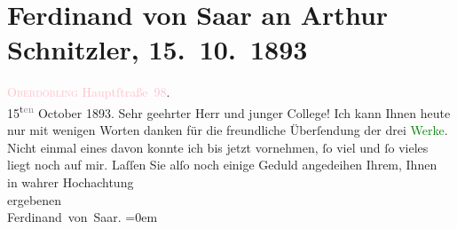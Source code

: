 

               \section[Ferdinand von Saar an Arthur Schnitzler, 15. 10. 1893]{ Ferdinand von Saar an Arthur Schnitzler,
                    15. 10. 1893}\nopagebreak{}\rehead{ }\normalsize\beginnumbering{} \toendnotes[C]{\smallbreak\pagebreak[2]} 
\toendnotes[C]{\smallbreak}\pstart
           \raggedleft{}{\pb}\textcolor{pink}{\textsc{Oberdöbling} Hauptſtraße 98}{}\ledrightnote{\textcolor{pink}{Döblinger Hauptstraße}}.{\\}15\textsuperscript{t\textcolor{gray}{en}} October 1893.\pend
           \pstart{}Sehr geehrter Herr und junger College!\pend\pstart
           Ich kann Ihnen heute nur mit wenigen Worten danken für die freundliche
                    Überſendung der drei \textcolor{green}{Werke}{}. Nicht einmal eines davon konnte ich
                    bis jetzt vornehmen, ſo viel und ſo vieles liegt noch auf mir. Laſſen Sie alſo
                    noch einige Geduld angedeihen\pend
           \pstart
           Ihrem, Ihnen{\\[\baselineskip]}in wahrer Hochachtung{\\[\baselineskip]}ergebenen{\\[\baselineskip]}\spacefill\mbox{Ferdinand
                        von Saar}.\pend
           \leftskip=0em{}\endnumbering{}  
      
